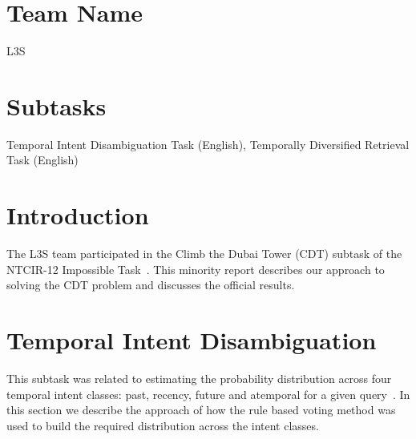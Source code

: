 \documentclass{sig-alternate}
\begin{document}
\section*{Team Name}
L3S

\section*{Subtasks}
Temporal Intent Disambiguation Task (English), Temporally Diversified Retrieval Task (English)


\section{Introduction}

The L3S team participated in the Climb the Dubai Tower (CDT) subtask of the NTCIR-12 Impossible Task~\cite{mioverview}.
This minority report describes our approach to solving the CDT problem and discusses the official results.

\section{Temporal Intent Disambiguation}
This subtask was related to estimating the probability distribution across four temporal intent classes: past, recency, future and atemporal for a given query~\cite{mioverview}. In this section we describe the approach of how the rule based voting method was used to build the required distribution across the intent classes.
\end{document}
